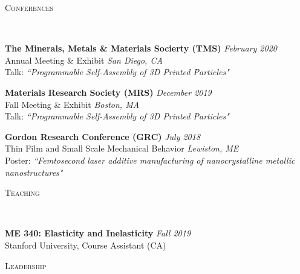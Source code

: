 \documentclass[9pt]{article}
\newenvironment{changemargin}[2]{%
  \begin{list}{}{%
    \setlength{\topsep}{0pt}%
    \setlength{\leftmargin}{#1}%
    \setlength{\rightmargin}{#2}%
    \setlength{\listparindent}{\parindent}%
    \setlength{\itemindent}{\parindent}%
    \setlength{\parsep}{\parskip}%
  }%
  \item[]}{\end{list}
}
\newcommand{\lineover}{
	\begin{changemargin}{-0.05in}{-0.05in}
		\vspace*{-8pt}
		\hrulefill \\
		\vspace*{-2pt}
	\end{changemargin}
}
\newcommand{\header}[1]{
	\begin{changemargin}{-0.5in}{-0.5in}
		\scshape{#1}\\
  	\lineover
	\end{changemargin}
}
\newenvironment{body} {
	\vspace*{-16pt}
	\begin{changemargin}{-0.25in}{-0.5in}
  }	
	{\end{changemargin}
}
\begin{document}
\medskip
\header{Conferences}
\begin{body}
	\vspace{14pt}
	\textbf{The Minerals, Metals \& Materials Socierty (TMS)}{} \hfill \emph{February 2020}{} \\
	Annual Meeting \& Exhibit \hfill \emph{San Diego, CA}{} \\
	Talk: \textit{``Programmable Self-Assembly of 3D Printed Particles"} 
	\\
\end{body}

\medskip

\begin{body}
	\vspace{14pt}
	\textbf{Materials Research Society (MRS)}{} \hfill \emph{December 2019}{} \\
	Fall Meeting \& Exhibit \hfill \emph{Boston, MA}{} \\
	Talk: \textit{``Programmable Self-Assembly of 3D Printed Particles"} 
	\\
	
\end{body}

\medskip

\begin{body}
	\vspace{14pt}
	\textbf{Gordon Research Conference (GRC)}{} \hfill \emph{July 2018}{} \\
	Thin Film and Small Scale Mechanical Behavior \hfill \emph{Lewiston, ME}{} \\
	Poster: \textit{``Femtosecond laser additive manufacturing of nanocrystalline metallic nanostructures"} 
	\\
\end{body}
\medskip
\header{Teaching}
\begin{body}
	\vspace{14pt}
	\textbf{ME 340: Elasticity and Inelasticity}{} \hfill \emph{Fall 2019}{} \\
	Stanford University, Course Assistant (CA) \hfill \emph{}{} \\
\end{body}
\medskip 
\header{Leadership}
\end{document}
